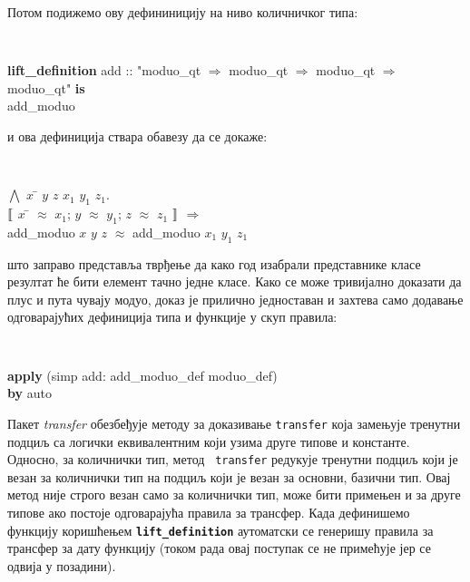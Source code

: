\noindent Потом подижемо ову дефининицију на ниво количничког типа:
\smallskip
{}
\begin{small}
{\tt 
\begin{tabbing}
\textbf{lif}\=\textbf{t\_definition} add :: "moduo\_qt $\Rightarrow$ moduo\_qt $\Rightarrow$ moduo\_qt $\Rightarrow$ moduo\_qt" \textbf{is} \\
\> add\_moduo
\end{tabbing}
}
\end{small}

\noindent и ова дефиниција ствара обавезу да се докаже:
\smallskip
{}
\begin{small}
{\tt 
\begin{tabbing}
$\bigwedge$ $x$ \= $y$ $z$ $x_1$ $y_1$ $z_1$. \\
       \> $\llbracket$ $x$ \= $\approx$ $x_1$; $y$ $\approx$ $y_1$; $z$ $\approx$ $z_1$ $\rrbracket$ $\Longrightarrow$ \\
       \>\> add\_moduo $x$ $y$ $z$ $\approx$ add\_moduo $x_1$ $y_1$ $z_1$
\end{tabbing}
}
\end{small}

\noindent што заправо представља тврђење да како год изабрали представнике класе
резултат ће бити елемент тачно једне класе. Како се може тривијално
доказати да плус и пута чувају модуо, доказ је прилично једноставан и
захтева само додавање одговарајућих дефиниција типа и функције у скуп
правила:
\smallskip
{}
\begin{small}
{\tt 
\begin{tabbing}
\textbf{apply} (simp add: add\_moduo\_def moduo\_def) \\
\textbf{by} auto
\end{tabbing}
}
\end{small}

Пакет \emph{transfer} обезбеђује методу за доказивање {\tt transfer}
која замењује тренутни подциљ са логички еквивалентним који узима
друге типове и константе. Односно, за количнички тип, метод {\tt
  transfer} редукује тренутни подциљ који је везан за количнички тип
на подциљ који је везан за основни, базични тип. Овај метод није
строго везан само за количнички тип, може бити примењен и за друге
типове ако постоје одговарајућа правила за трансфер. Када дефинишемо
функцију коришћењем {\tt \textbf{lift\_definition}} аутоматски се
генеришу правила за трансфер за дату функцију (током рада овај
поступак се не примећује јер се одвија у позадини).

